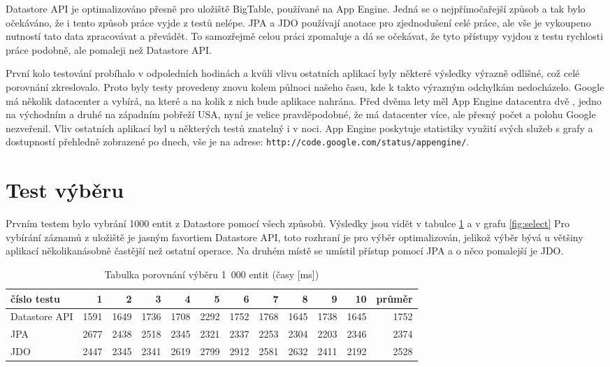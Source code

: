 Datastore API je optimalizováno přesně pro uložiště BigTable, používané na App Engine. Jedná se o nejpřímočařejší způsob a tak bylo očekáváno, že i tento způsob práce vyjde z testů nelépe. JPA a JDO používají anotace pro zjednodušení celé práce, ale vše je vykoupeno nutností tato data zpracovávat a převádět. To samozřejmě celou práci zpomaluje a dá se očekávat, že tyto přístupy vyjdou z testu rychlosti práce podobně, ale pomaleji než Datastore API.

První kolo testování probíhalo v odpoledních hodinách a kvůli vlivu ostatních aplikací byly některé výsledky výrazně odlišné, což celé porovnání zkreslovalo. Proto byly testy provedeny znovu kolem půlnoci našeho času, kde k takto výrazným odchylkám nedocházelo. Google má několik datacenter a vybírá, na které a na kolik z nich bude aplikace nahrána. Před dvěma lety měl App Engine datacentra dvě , jedno na východním a druhé na západním pobřeží USA, nyní je velice pravděpodobné, že má datacenter více, ale přesný počet a polohu Google nezveřenil. Vliv ostatních aplikací byl u některých testů znatelný i v noci. App Engine poskytuje statistiky využití svých služeb s grafy a dostupností přehledně zobrazené po dnech, vše je na  adrese: \verb|http://code.google.com/status/appengine/|.

\section{Test výběru}
Prvním testem bylo vybrání 1000 entit z Datastore pomocí všech způsobů. Výsledky jsou vidět v tabulce \ref{tab:select} a v grafu \ref{fig:select} Pro vybírání záznamů z uložiště je jasným favortiem Datastore API, toto rozhraní je pro výběr optimalizován, jelikož výběr bývá u většiny aplikací několikanásobně častější než ostatní operace. Na druhém místě se umístil přístup pomocí JPA a o něco pomalejší je JDO.

\begin{table}[h]
\centering
\caption[Tabulka porovnání výběru 1~000 entit]{Tabulka porovnání výběru 1~000 entit (časy [ms])}\label{tab:select}
\begin{tabular}{|l|r|r|r|r|r|r|r|r|r|r|r|}
   \hline
číslo testu	& 1		& 2		& 3		& 4		& 5		& 6		& 7		& 8		& 9		& 10		& průměr \\
   \hline
Datastore API	& 1591	& 1649	& 1736	& 1708	& 2292	& 1752	& 1768	& 1645	& 1738	& 1645	& 1752 \\
JPA	& 2677	& 2438	& 2518	& 2345	& 2321	& 2337	& 2253	& 2304	& 2203	& 2346	& 2374 \\
JDO	& 2447	& 2345	& 2341	& 2619	& 2799	& 2912	& 2581	& 2632	& 2411	& 2192	& 2528 \\
   \hline
\end{tabular}
\end{table}

